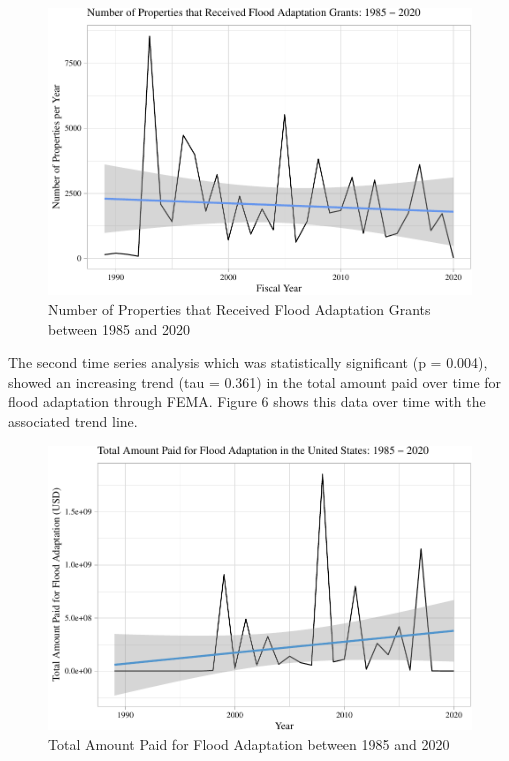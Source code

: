 \documentclass[
  12pt,
]{article}
\begin{document}
\begin{figure}
\centering
\includegraphics{finalreport_files/figure-latex/unnamed-chunk-12-1.pdf}
\caption{Number of Properties that Received Flood Adaptation Grants
between 1985 and 2020}
\end{figure}

The second time series analysis which was statistically significant (p =
0.004), showed an increasing trend (tau = 0.361) in the total amount
paid over time for flood adaptation through FEMA. Figure 6 shows this
data over time with the associated trend line. \newpage

\begin{figure}
\centering
\includegraphics{finalreport_files/figure-latex/unnamed-chunk-13-1.pdf}
\caption{Total Amount Paid for Flood Adaptation between 1985 and 2020}
\end{figure}
\end{document}
